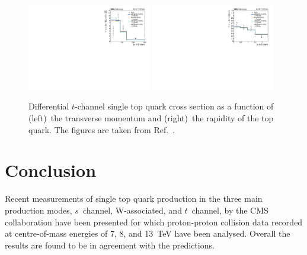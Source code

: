 \documentclass{PoS}
\begin{document}
\begin{figure}[!htb]
\begin{center}
\includegraphics[width=0.48\textwidth]{unfolded_top_pt.pdf}\hspace{0.02\textwidth}
\includegraphics[width=0.48\textwidth]{unfolded_top_y.pdf}
\caption{\label{fig:t-channel-diff}Differential $t$-channel single top quark cross section as a function of (left)~the transverse momentum and (right)~the rapidity of the top quark. The figures are taken from Ref.~\cite{tchdiff}.}
\end{center}
\end{figure}

\section{Conclusion}

Recent measurements of single top quark production in the three main production modes, $s$~channel, W-associated, and $t$~channel, by the CMS collaboration have been presented for which proton-proton collision data recorded at centre-of-mass energies of 7, 8, and 13~TeV have been analysed. Overall the results are found to be in agreement with the predictions.
\end{document}
